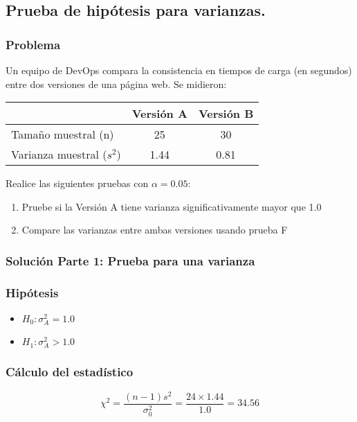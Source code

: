 \newpage

\subsection{Prueba de hipótesis para varianzas.}

\subsubsection*{Problema}
Un equipo de DevOps compara la consistencia en tiempos de carga (en segundos) entre dos versiones de una página web. Se midieron:

\begin{center}
\begin{tabular}{lcc}
\toprule
& Versión A & Versión B \\
\midrule
Tamaño muestral (n) & 25 & 30 \\
Varianza muestral ($s^2$) & 1.44 & 0.81 \\
\bottomrule
\end{tabular}
\end{center}

Realice las siguientes pruebas con $\alpha = 0.05$:
\begin{enumerate}
\item Pruebe si la Versión A tiene varianza significativamente mayor que 1.0
\item Compare las varianzas entre ambas versiones usando prueba F
\end{enumerate}

\subsubsection*{Solución Parte 1: Prueba para una varianza}

\subsubsection*{Hipótesis}
\begin{itemize}
\item $H_0: \sigma^2_A = 1.0$
\item $H_1: \sigma^2_A > 1.0$
\end{itemize}

\subsubsection*{Cálculo del estadístico}
\[
\chi^2 = \frac{(n-1)s^2}{\sigma_0^2} = \frac{24 \times 1.44}{1.0} = 34.56
\]


